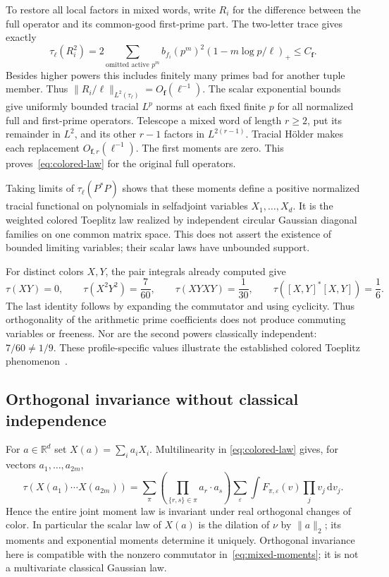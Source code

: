 \documentclass[11pt,reqno]{amsart}
\numberwithin{equation}{section}
\newcommand{\R}{\mathbb R}
\newcommand{\dd}{\,\mathrm d}
\newcommand{\norm}[1]{\lVert#1\rVert}
\begin{document}
To restore all local factors in mixed words, write $R_i$ for
the difference between the full operator and its common-good
first-prime part. The two-letter trace gives exactly
\[
 \tau_\ell(R_i^2)=2\sum_{\text{omitted active }p^m}
               b_{f_i}(p^m)^2(1-m\log p/\ell)_+
       \le C_{\boldsymbol f}.
\]
Besides higher powers this includes finitely many primes bad
for another tuple member. Thus
$\norm{R_i/\ell}_{L^2(\tau_\ell)}=O_{\boldsymbol f}(\ell^{-1})$.
The scalar exponential bounds give uniformly bounded tracial
$L^p$ norms at each fixed finite $p$ for all normalized full and
first-prime operators. Telescope a mixed word of length $r\ge2$,
put its remainder in $L^2$, and its other $r-1$ factors in
$L^{2(r-1)}$. Tracial H\"older makes each replacement
$O_{\boldsymbol f,r}(\ell^{-1})$. The first moments are zero.
This proves~\eqref{eq:colored-law} for the original full operators.

Taking limits of $\tau_\ell(P^*P)$ shows that these moments
define a positive normalized tracial functional on polynomials
in selfadjoint variables $X_1,\ldots,X_d$. It is the weighted
colored Toeplitz law realized by independent circular Gaussian
diagonal families on one common matrix space. This does not
assert the existence of bounded limiting variables; their scalar
laws have unbounded support.

For distinct colors $X,Y$, the pair integrals already computed give
\begin{equation}\label{eq:mixed-moments}
 \tau(XY)=0,\qquad
 \tau(X^2Y^2)=\frac7{60},\qquad
 \tau(XYXY)=\frac1{30},\qquad
 \tau([X,Y]^*[X,Y])=\frac16.
\end{equation}
The last identity follows by expanding the commutator and using
cyclicity. Thus orthogonality of the arithmetic prime coefficients
does not produce commuting variables or freeness. Nor are the
second powers classically independent: $7/60\ne1/9$.
These profile-specific values illustrate the established colored
Toeplitz phenomenon~\cite{BHS}.

\subsection*{Orthogonal invariance without classical independence}

For $a\in\R^d$ set $X(a)=\sum_i a_iX_i$. Multilinearity in
\eqref{eq:colored-law} gives, for vectors $a_1,\ldots,a_{2m}$,
\begin{equation}\label{eq:vector-pairing}
 \tau(X(a_1)\cdots X(a_{2m}))
 =\sum_\pi\left(\prod_{\{r,s\}\in\pi}a_r\cdot a_s\right)
        \sum_{\varepsilon}\int F_{\pi,\varepsilon}(v)
                                        \prod_jv_j\dd v_j.
\end{equation}
Hence the entire joint moment law is invariant under real
orthogonal changes of color. In particular the scalar law of
$X(a)$ is the dilation of $\nu$ by $\norm a_2$; its moments
and exponential moments determine it uniquely. Orthogonal
invariance here is compatible with the nonzero commutator
in~\eqref{eq:mixed-moments}; it is not a multivariate classical
Gaussian law.
\end{document}
